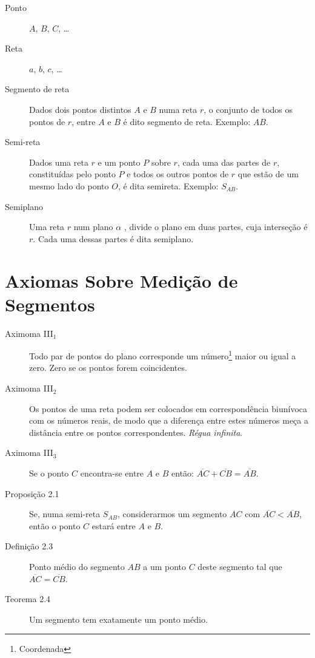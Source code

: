 \documentclass[11pt]{article}
\begin{document}
\begin{description}
  \item[Ponto] $A$, $B$, $C$, \ldots

  \item[Reta] $a$, $b$, $c$, \ldots

  \item[Segmento de reta]
  Dados dois pontos distintos $A$ e $B$ numa reta $r$, o conjunto de todos os
  pontos de $r$, entre $A$ e $B$ é dito segmento de reta. Exemplo: $AB$.

  \item[Semi-reta]
  Dados uma reta $r$ e um ponto $P$ sobre $r$, cada uma das partes de $r$,
  constituídas pelo ponto $P$ e todos os outros pontos de $r$ que estão de um
  mesmo lado do ponto $O$, é dita semireta. Exemplo: $S_{AB}$.

  \item[Semiplano]
  Uma reta $r$ num plano $\alpha$ , divide o plano em duas partes, cuja
  interseção é $r$. Cada uma dessas partes é dita semiplano.
\end{description}

\section{Axiomas Sobre Medição de Segmentos}

\begin{description}
  \item[Aximoma III$_{1}$] Todo par de pontos do plano corresponde um
    número\footnote{Coordenada} maior ou igual a zero. Zero se os pontos forem
    coincidentes.

  \item[Aximoma III$_{2}$] Os pontos de uma reta podem ser colocados em
    correspondência biunívoca com os números reais, de modo que a diferença
    entre estes números meça a distância entre os pontos correspondentes.
    \emph{Régua infinita}.

  \item[Aximoma III$_{3}$] Se o ponto $C$ encontra-se entre $A$ e $B$ então:
    $\overline{AC} + \overline{CB} = \overline{AB}$.

  \item[Proposição 2.1] Se, numa semi-reta $S_{AB}$, considerarmos um segmento
    $AC$ com $\overline{AC} < \overline{AB}$, então o ponto $C$ estará entre
    $A$ e $B$.

  \item[Definição 2.3] Ponto médio do segmento $AB$ a um ponto $C$ deste
    segmento tal que $\overline{AC} = \overline{CB}$.

  \item[Teorema 2.4] Um segmento tem exatamente um ponto médio.
\end{description}
\end{document}
